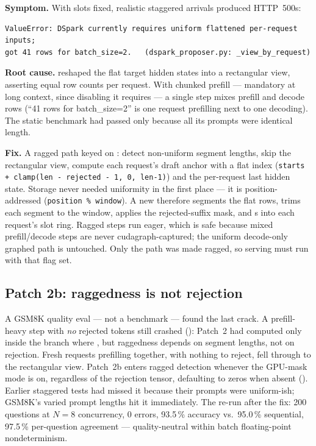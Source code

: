 \textbf{Symptom.} With slots fixed, realistic staggered arrivals produced
HTTP~500s:

\begin{lstlisting}
ValueError: DSpark currently requires uniform flattened per-request inputs;
got 41 rows for batch_size=2.   (dspark_proposer.py: _view_by_request)
\end{lstlisting}

\textbf{Root cause.}  reshaped the flat target hidden
states into a rectangular  view, asserting equal row
counts per request. With chunked prefill --- mandatory at long context, since
disabling it requires  --- a
single step mixes prefill and decode rows (``41 rows for batch\_size=2'' is
one request prefilling next to one decoding). The static benchmark had
passed only because all its prompts were identical length.

\textbf{Fix.} A ragged path keyed on : detect
non-uniform segment lengths, skip the rectangular view, compute each
request's draft anchor with a flat index
(\texttt{starts + clamp(len - rejected - 1, 0, len-1)}) and
 the per-request last hidden state. Storage never needed
uniformity in the first place --- it is position-addressed
(\texttt{position \% window}). A new  therefore
segments the flat rows, trims each segment to the window, applies the
rejected-suffix mask, and s into each request's slot ring.
Ragged steps run eager, which is safe because mixed prefill/decode steps are
never cudagraph-captured; the uniform decode-only graphed path is untouched.
Only the  path was made
ragged, so serving must run with that flag set.

\subsection{Patch 2b: raggedness is not rejection}

A GSM8K quality eval --- not a benchmark --- found the last crack. A
prefill-heavy step with \emph{no} rejected tokens still crashed
(): Patch~2 had computed 
only inside the branch where ,
but raggedness depends on  segment lengths, not on
rejection. Fresh requests prefilling together, with nothing to reject, fell
through to the rectangular view. Patch~2b enters ragged detection whenever
the GPU-mask mode is on, regardless of the rejection tensor, defaulting
 to zeros when absent ().
Earlier staggered tests had missed it
because their prompts were uniform-ish; GSM8K's varied prompt lengths hit it
immediately. The re-run after the fix: 200 questions at $N{=}8$ concurrency,
0 errors, 93.5\,\% accuracy vs.\ 95.0\,\% sequential, 97.5\,\% per-question
agreement --- quality-neutral within batch floating-point nondeterminism.

